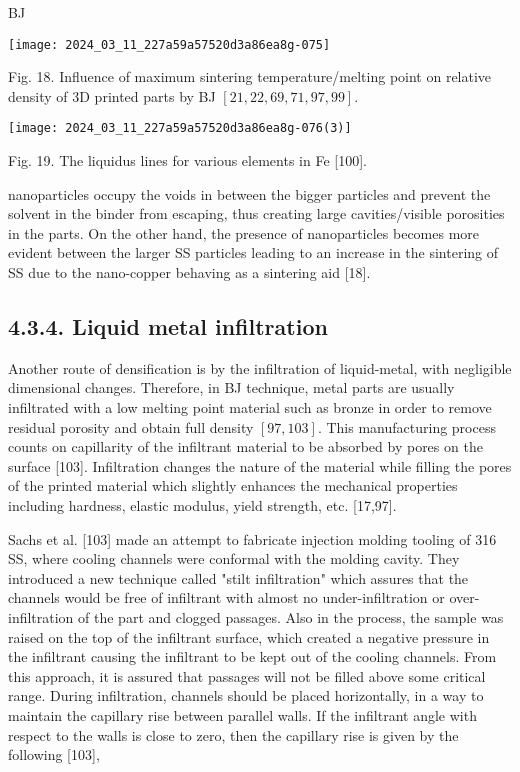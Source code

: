 \documentclass[10pt]{article}
\begin{document}
BJ

\begin{center}
\texttt{[image: 2024\_03\_11\_227a59a57520d3a86ea8g-075]}
\end{center}

Fig. 18. Influence of maximum sintering temperature/melting point on relative density of 3D printed parts by BJ $[21,22,69,71,97,99]$.

\begin{center}
\texttt{[image: 2024\_03\_11\_227a59a57520d3a86ea8g-076(3)]}
\end{center}

Fig. 19. The liquidus lines for various elements in Fe [100].

nanoparticles occupy the voids in between the bigger particles and prevent the solvent in the binder from escaping, thus creating large cavities/visible porosities in the parts. On the other hand, the presence of nanoparticles becomes more evident between the larger SS particles leading to an increase in the sintering of SS due to the nano-copper behaving as a sintering aid [18].

\subsection*{4.3.4. Liquid metal infiltration}
Another route of densification is by the infiltration of liquid-metal, with negligible dimensional changes. Therefore, in BJ technique, metal parts are usually infiltrated with a low melting point material such as bronze in order to remove residual porosity and obtain full density $[97,103]$. This manufacturing process counts on capillarity of the infiltrant material to be absorbed by pores on the surface [103]. Infiltration changes the nature of the material while filling the pores of the printed material which slightly enhances the mechanical properties including hardness, elastic modulus, yield strength, etc. [17,97].

Sachs et al. [103] made an attempt to fabricate injection molding tooling of 316 SS, where cooling channels were conformal with the molding cavity. They introduced a new technique called "stilt infiltration" which assures that the channels would be free of infiltrant with almost no under-infiltration or over-infiltration of the part and clogged passages. Also in the process, the sample was raised on the top of the infiltrant surface, which created a negative pressure in the infiltrant causing the infiltrant to be kept out of the cooling channels. From this approach, it is assured that passages will not be filled above some critical range. During infiltration, channels should be placed horizontally, in a way to maintain the capillary rise between parallel walls. If the infiltrant angle with respect to the walls is close to zero, then the capillary rise is given by the following [103],
\end{document}
